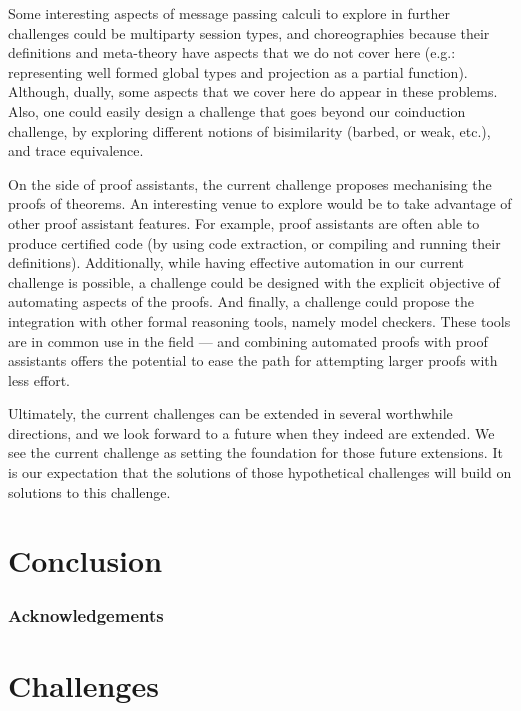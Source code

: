 \documentclass[runningheads]{llncs}
\begin{document}
Some interesting aspects of message passing calculi to explore in
further challenges could be multiparty session types, and
choreographies because their definitions and meta-theory have aspects
that we do not cover here (e.g.: representing well formed global types
and projection as a partial function). Although, dually, some aspects
that we cover here do appear in these problems. Also, one could easily
design a challenge that goes beyond our coinduction challenge, by
exploring different notions of bisimilarity (barbed, or weak, etc.),
and trace equivalence.

On the side of proof assistants, the current challenge proposes
mechanising the proofs of theorems. An interesting venue to explore
would be to take advantage of other proof assistant features. For
example, proof assistants are often able to produce certified code (by
using code extraction, or compiling and running their definitions).
Additionally, while having effective automation in our current
challenge is possible, a challenge could be designed with the explicit
objective of automating aspects of the proofs. And finally, a
challenge could propose the integration with other formal reasoning
tools, namely model checkers. These tools are in common use in the
field --- and combining automated proofs with proof assistants
offers the potential to ease the path for attempting larger proofs
with less effort.

Ultimately, the current challenges can be extended in several
worthwhile directions, and we look forward to a future when they
indeed are extended. We see the current challenge as setting
the foundation for those future extensions. It is our expectation that
the solutions of those hypothetical challenges will build on solutions
to this challenge.

\section{Conclusion}\label{sec:conclusion}


\subsubsection*{Acknowledgements}


\appendix
\section{Challenges}\label{app:challenges}




\end{document}
